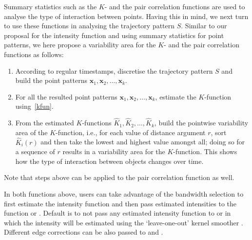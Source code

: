 \documentclass[article]{jss}
\begin{document}
Summary statistics such as the $K$- and the pair correlation functions are used to analyse the type of interaction between points. Having this in mind, we next turn to use these functions in analysing the trajectory pattern $S$. Similar to our proposal for the intensity function and using summary statistics for point patterns, we here propose a variability area for the $K$- and the pair correlation functions as follows:
  \begin{leftbar}
  \begin{enumerate}
  \item According to regular timestamps, discretise the trajectory pattern $S$ and build the point patterns $\mathbf{x}_1,\mathbf{x}_2, \ldots, \mathbf{x}_k$.
  \item For all the resulted point patterns $\mathbf{x}_1,\mathbf{x}_2, \ldots, \mathbf{x}_k$, estimate the $K$-function using~\ref{kfun}.
  \item From the estimated $K$-functions $\widehat{K}_1, \widehat{K}_2,\ldots,\widehat{K}_k$, build the pointwise variability area of the $K$-function, i.e., for each value of distance argument $r$, sort $\widehat{K}_i(r)$ and then take the lowest and highest value amongst all; doing so for a sequence of $r$ results in a variability area for the $K$-function. This shows how the type of interaction between objects changes over time.
  \end{enumerate}
  \end{leftbar}

Note that steps above can be applied to the pair correlation function as well.

In both functions above, users can take advantage of the bandwidth selection to first estimate the intensity function and then pass estimated intensities to the function  or . Default is to not pass any estimated intensity function to  or  in which the intensity will be estimated using the `leave-one-out' kernel smoother \citep{baddeley00,BRT15}. Different edge corrections can be also passed to  and . 
  
\end{document}

